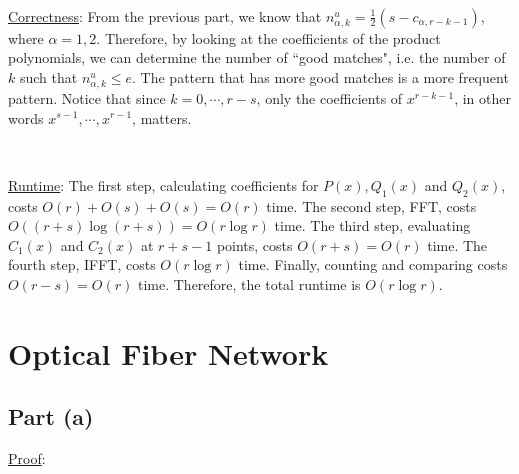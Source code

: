 \documentclass{article}
\begin{document}
~

\noindent\underline{Correctness}: From the previous part, we know that $n^u_{\alpha,k}=\frac{1}{2}(s-c_{\alpha,r-k-1})$, where $\alpha=1,2$. Therefore, by looking at the coefficients of the product polynomials, we can determine the number of ``good matches", i.e. the number of $k$ such that $n^u_{\alpha,k}\leqslant e$. The pattern that has more good matches is a more frequent pattern. Notice that since $k=0,\cdots,r-s$, only the coefficients of $x^{r-k-1}$, in other words $x^{s-1},\cdots,x^{r-1}$, matters.

~

\noindent\underline{Runtime}: The first step, calculating coefficients for $P(x),Q_1(x)$ and $Q_2(x)$, costs $O(r)+O(s)+O(s)=O(r)$ time. The second step, FFT, costs $O((r+s)\log(r+s))=O(r\log r)$ time. The third step, evaluating $C_1(x)$ and $C_2(x)$ at $r+s-1$ points, costs $O(r+s)=O(r)$ time. The fourth step, IFFT, costs $O(r\log r)$ time. Finally, counting and comparing costs $O(r-s)=O(r)$ time. Therefore, the total runtime is $O(r\log r)$.

\section{Optical Fiber Network}
\subsection{Part (a)}
\noindent\underline{Proof}: 


\end{document}
